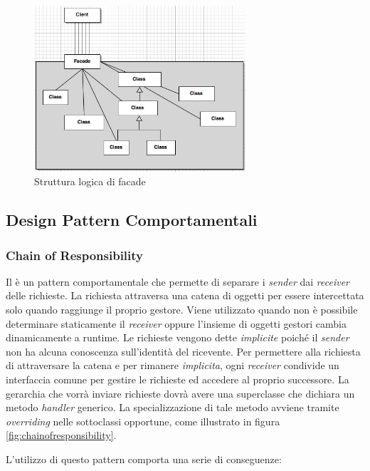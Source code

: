\begin{figure}[H]
\centering \includegraphics[width=0.7\textwidth]{patterns/facade.jpg}
\caption{Struttura logica di facade}
\label{fig:facade}
\end{figure}

\subsection{Design Pattern Comportamentali}

\subsubsection{Chain of Responsibility}
Il  è un pattern comportamentale che permette di separare i \emph{sender} dai \emph{receiver} delle richieste. La richiesta attraversa una catena di oggetti per essere intercettata solo quando raggiunge il proprio gestore. Viene utilizzato quando non è possibile determinare staticamente il \emph{receiver} oppure l'insieme di oggetti gestori cambia dinamicamente a runtime.
Le richieste vengono dette \emph{implicite} poiché il \emph{sender} non ha alcuna conoscenza sull'identità del ricevente. Per permettere alla richiesta di attraversare la catena e per rimanere \emph{implicita}, ogni \emph{receiver} condivide un interfaccia comune per gestire le richieste ed accedere al proprio successore. 
La gerarchia che vorrà inviare richieste dovrà avere una superclasse che dichiara un metodo \emph{handler} generico. La specializzazione di tale metodo avviene tramite \emph{overriding} nelle sottoclassi opportune, come illustrato in figura \ref{fig:chainofresponsibility}.	

L'utilizzo di questo pattern comporta una serie di conseguenze:
		
